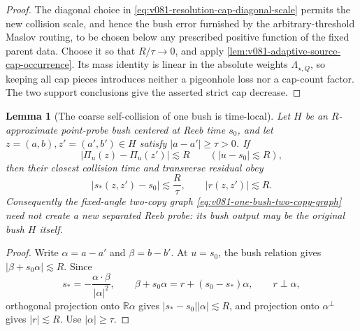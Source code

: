 \documentclass[10pt]{article}
\newtheorem{lemma}[theorem]{Lemma}
\begin{document}
\begin{proof}
The diagonal choice in
\eqref{eq:v081-resolution-cap-diagonal-scale} permits the new collision scale, and hence the bush
error furnished by the arbitrary-threshold Maslov routing, to be chosen below any prescribed
positive function of the fixed parent data.  Choose it so that \(R/\tau\to0\), and apply
\cref{lem:v081-adaptive-source-cap-occurrence}.  Its mass identity is linear in the absolute weights
\(\Lambda_{\star,Q}\), so keeping all cap pieces introduces neither a pigeonhole loss nor a cap-count
factor.  The two support conclusions give the asserted strict cap decrease.
\end{proof}

\begin{lemma}[The coarse self-collision of one bush is time-local]
\label{lem:v081-one-bush-self-return-time-local}
Let \(H\) be an \(R\)-approximate point-probe bush centered at Reeb time \(s_0\), and let
\(z=(a,b),z'=(a',b')\in H\) satisfy \(|a-a'|\ge\tau>0\).  If
\[
|\Pi_u(z)-\Pi_u(z')|\lesssim R
\qquad
(|u-s_0|\lesssim R),
\]
then their closest collision time and transverse residual obey
\begin{equation}
\label{eq:v081-one-bush-self-return-time-local}
\boxed{
|s_*(z,z')-s_0|
\lesssim
\frac R\tau,
\qquad
|r(z,z')|\lesssim R.
}
\end{equation}
Consequently the fixed-angle two-copy graph
\eqref{eq:v081-one-bush-two-copy-graph} need not create a new separated Reeb probe: its bush output
may be the original bush \(H\) itself.
\end{lemma}

\begin{proof}
Write \(\alpha=a-a'\) and \(\beta=b-b'\).  At \(u=s_0\), the bush relation gives
\(|\beta+s_0\alpha|\lesssim R\).  Since
\[
s_*=-\frac{\alpha\cdot\beta}{|\alpha|^2},
\qquad
\beta+s_0\alpha
=
r+(s_0-s_*)\alpha,
\qquad
r\perp\alpha,
\]
orthogonal projection onto \(\mathbb R\alpha\) gives
\(|s_*-s_0||\alpha|\lesssim R\), and projection onto \(\alpha^\perp\) gives
\(|r|\lesssim R\).  Use \(|\alpha|\ge\tau\).
\end{proof}
\end{document}
